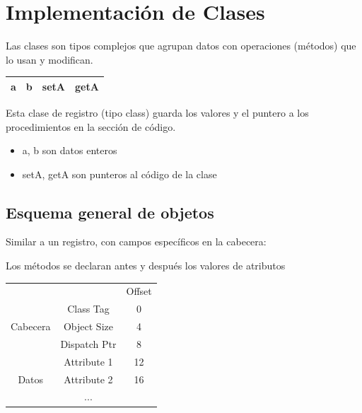 \documentclass[12pt, twoside, openright]{report} %
\begin{document}
\section{Implementación de Clases}
Las clases son tipos complejos que agrupan datos con operaciones (métodos) que lo usan y modifican.

\begin{table}[h]
  \begin{tabular}{|c|c|c|c|}
  \hline
  a & b & setA & getA \\ \hline
  \end{tabular}
\end{table}

Esta clase de registro (tipo class) guarda los valores y el puntero a los procedimientos en la sección de código.
\begin{itemize}
  \item a,  b son datos enteros
  \item setA, getA son punteros al código de la clase
\end{itemize}

\subsection{Esquema general de objetos}
Similar a un registro, con campos específicos en la cabecera:

Los métodos se declaran antes y después los valores de atributos

\begin{table}[h]
  \begin{tabular}{ccc}
                                                 &                                   & Offset \\ \cline{2-2}
  \multicolumn{1}{c|}{\multirow{3}{*}{Cabecera}} & \multicolumn{1}{c|}{Class Tag}    & 0      \\ \cline{2-2}
  \multicolumn{1}{c|}{}                          & \multicolumn{1}{c|}{Object Size}  & 4      \\ \cline{2-2}
  \multicolumn{1}{c|}{}                          & \multicolumn{1}{c|}{Dispatch Ptr} & 8      \\ \cline{2-2}
  \multicolumn{1}{c|}{\multirow{3}{*}{Datos}}    & \multicolumn{1}{c|}{Attribute 1}  & 12     \\ \cline{2-2}
  \multicolumn{1}{c|}{}                          & \multicolumn{1}{c|}{Attribute 2}  & 16     \\ \cline{2-2}
  \multicolumn{1}{c|}{}                          & \multicolumn{1}{c|}{...}          &        \\ \cline{2-2}
  \end{tabular}
  \end{table}
\end{document}

